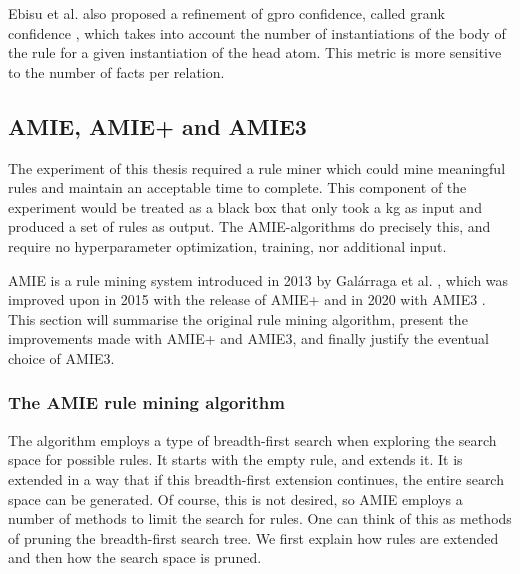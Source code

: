 Ebisu et al. also proposed a refinement of \gls{gpro} confidence, called \gls{grank} confidence \cite{gpro}, which takes into account the number of instantiations of the body of the rule for a given instantiation of the head atom. This metric is more sensitive to the number of facts per relation.


\subsection{AMIE, AMIE+ and AMIE3}
\label{the_amies}
The experiment of this thesis required a rule miner which could mine meaningful rules and maintain an acceptable time to complete. This component of the experiment would be treated as a black box that only took a \gls{kg} as input and produced a set of rules as output. The AMIE-algorithms do precisely this, and require no hyperparameter optimization, training, nor additional input.

AMIE is a rule mining system introduced in 2013 by Galárraga et al. \cite{amie}, which was improved upon in 2015 with the release of AMIE+ \cite{amie_plus} and in 2020 with AMIE3 \cite{amie3}. This section will summarise the original rule mining algorithm, present the improvements made with AMIE+ and AMIE3, and finally justify the eventual choice of AMIE3.

\subsubsection{The AMIE rule mining algorithm}
The algorithm employs a type of breadth-first search when exploring the search space for possible rules. It starts with the empty rule, and extends it. It is extended in a way that if this breadth-first extension continues, the entire search space can be generated. Of course, this is not desired, so AMIE employs a number of methods to limit the search for rules. One can think of this as methods of pruning the breadth-first search tree. We first explain how rules are extended and then how the search space is pruned.

